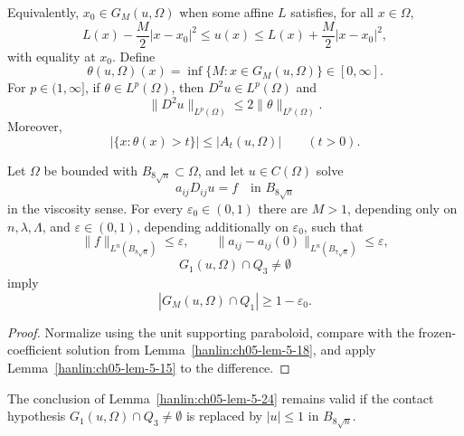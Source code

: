 Equivalently, $x_0\in G_M(u,\Omega)$ when some affine $L$ satisfies,
for all $x\in\Omega$,
\[
L(x)-\frac M2|x-x_0|^2\leq u(x)
\leq L(x)+\frac M2|x-x_0|^2,
\]
with equality at $x_0$. Define
\[
\theta(u,\Omega)(x)=\inf\{M:x\in G_M(u,\Omega)\}\in[0,\infty].
\]
For $p\in(1,\infty]$, if $\theta\in L^p(\Omega)$, then
$D^2u\in L^p(\Omega)$ and
\[
\|D^2u\|_{L^p(\Omega)}\leq2\|\theta\|_{L^p(\Omega)}.
\]
Moreover,
\[
|\{x:\theta(x)>t\}|\leq|A_t(u,\Omega)|\qquad(t>0).
\]

\begin{lemma}\label{hanlin:ch05-lem-5-24}
Let $\Omega$ be bounded with $B_{8\sqrt n}\subset\Omega$, and let
$u\in C(\Omega)$ solve
\[
a_{ij}D_{ij}u=f\quad\text{in }B_{8\sqrt n}
\]
in the viscosity sense. For every $\varepsilon_0\in(0,1)$ there are
$M>1$, depending only on $n,\lambda,\Lambda$, and $\varepsilon\in(0,1)$,
depending additionally on $\varepsilon_0$, such that
\[
\|f\|_{L^n(B_{8\sqrt n})}\leq\varepsilon,
\qquad
\|a_{ij}-a_{ij}(0)\|_{L^n(B_{7\sqrt n})}\leq\varepsilon,
\]
\[
G_1(u,\Omega)\cap Q_3\neq\emptyset
\]
imply
\[
|G_M(u,\Omega)\cap Q_1|\geq1-\varepsilon_0.
\]
\end{lemma}

\begin{proof}
\sketch Normalize using the unit supporting paraboloid, compare with the
frozen-coefficient solution from Lemma~\ref{hanlin:ch05-lem-5-18}, and
apply Lemma~\ref{hanlin:ch05-lem-5-15} to the difference.
\end{proof}



\begin{remark}\label{hanlin:ch05-rem-5-25}
The conclusion of Lemma~\ref{hanlin:ch05-lem-5-24} remains valid if the
contact hypothesis $G_1(u,\Omega)\cap Q_3\neq\emptyset$ is replaced by
$|u|\leq1$ in $B_{8\sqrt n}$.
\end{remark}
